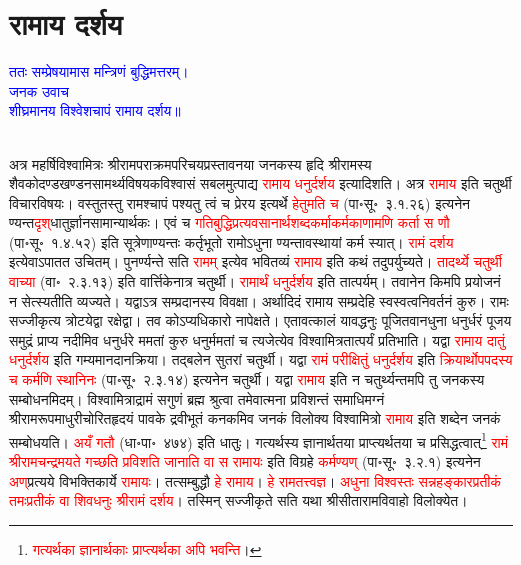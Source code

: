 \section[रामाय दर्शय]{रामाय दर्शय}
\centering\textcolor{blue}{ततः सम्प्रेषयामास मन्त्रिणं बुद्धिमत्तरम्।\nopagebreak\\
जनक उवाच\nopagebreak\\
शीघ्रमानय विश्वेशचापं रामाय दर्शय॥}\nopagebreak\\
\\
\begin{sloppypar}\justifying\noindent\hspace{10mm} अत्र महर्षि\-विश्वामित्रः श्रीराम\-पराक्रम\-परिचय\-प्रस्तावनया जनकस्य हृदि श्रीरामस्य शैव\-कोदण्ड\-खण्डन\-सामर्थ्य\-विषयक\-विश्वासं सबलमुत्पाद्य \textcolor{red}{रामाय धनुर्दर्शय} इत्यादिशति। अत्र \textcolor{red}{रामाय} इति चतुर्थी विचार\-विषयः। वस्तुतस्तु रामश्चापं पश्यतु त्वं च प्रेरय इत्यर्थे \textcolor{red}{हेतुमति च} (पा॰सू॰~३.१.२६) इत्यनेन ण्यन्त\-\textcolor{red}{दृश्‌}\-धातुर्ज्ञान\-सामान्यार्थकः। एवं च \textcolor{red}{गति\-बुद्धि\-प्रत्यवसानार्थ\-शब्द\-कर्माकर्मकाणामणि कर्ता स णौ} (पा॰सू॰~१.४.५२) इति सूत्रेणाण्यन्तः कर्तृ\-भूतो रामोऽधुना ण्यन्तावस्थायां कर्म स्यात्। \textcolor{red}{रामं दर्शय} इत्येवाऽपातत उचितम्। पुनर्ण्यन्ते सति \textcolor{red}{रामम्‌} इत्येव भवितव्यं \textcolor{red}{रामाय} इति कथं तदुपर्युच्यते। \textcolor{red}{तादर्थ्ये चतुर्थी वाच्या} (वा॰~२.३.१३) इति वार्त्तिकेनात्र चतुर्थी। \textcolor{red}{रामार्थं धनुर्दर्शय} इति तात्पर्यम्। तवानेन किमपि प्रयोजनं न सेत्स्यतीति व्यज्यते। यद्वाऽत्र सम्प्रदानस्य विवक्षा। अर्थादिदं रामाय सम्प्रदेहि स्व\-स्वत्व\-निवर्तनं कुरु। रामः सज्जीकृत्य त्रोटयेद्वा रक्षेद्वा। तव कोऽप्यधिकारो नापेक्षते। एतावत्कालं यावद्धनुः पूजितवानधुना धनुर्धरं पूजय समुद्रं प्राप्य नदीमिव धनुर्धरे ममतां कुरु धनुर्ममतां च त्यजेत्येव विश्वामित्र\-तात्पर्यं प्रतिभाति। यद्वा \textcolor{red}{रामाय दातुं धनुर्दर्शय} इति गम्यमान\-दान\-क्रिया। तद्बलेन सुतरां चतुर्थी। यद्वा \textcolor{red}{रामं परीक्षितुं धनुर्दर्शय} इति \textcolor{red}{क्रियार्थोपपदस्य च कर्मणि स्थानिनः} (पा॰सू॰~२.३.१४) इत्यनेन चतुर्थी। यद्वा \textcolor{red}{रामाय} इति न चतुर्थ्यन्तमपि तु जनकस्य सम्बोधनमिदम्। विश्वामित्राद्रामं सगुणं ब्रह्म श्रुत्वा तमेवात्मना प्रविशन्तं समाधि\-मग्नं श्रीराम\-रूप\-माधुरी\-चोरित\-हृदयं पावके द्रवीभूतं कनकमिव जनकं विलोक्य विश्वामित्रो \textcolor{red}{रामाय} इति शब्देन जनकं सम्बोधयति। \textcolor{red}{अयँ गतौ} (धा॰पा॰~४७४) इति धातुः। गत्यर्थस्य ज्ञानार्थतया प्राप्त्यर्थतया च प्रसिद्धत्वात्\footnote{\textcolor{red}{गत्यर्थका ज्ञानार्थकाः प्राप्त्यर्थका अपि भवन्ति}।} \textcolor{red}{रामं श्रीरामचन्द्रमयते गच्छति प्रविशति जानाति वा स रामायः} इति विग्रहे \textcolor{red}{कर्मण्यण्‌} (पा॰सू॰~३.२.१) इत्यनेन \textcolor{red}{अण्‌}\-प्रत्यये विभक्तिकार्ये \textcolor{red}{रामायः}। तत्सम्बुद्धौ \textcolor{red}{हे रामाय}। \textcolor{red}{हे राम\-तत्त्वज्ञ}। \textcolor{red}{अधुना विश्वस्तः सन्नहङ्कार\-प्रतीकं तमःप्रतीकं वा शिव\-धनुः श्रीरामं दर्शय}। तस्मिन् सज्जीकृते सति यथा श्रीसीता\-राम\-विवाहो विलोक्येत।\end{sloppypar}
